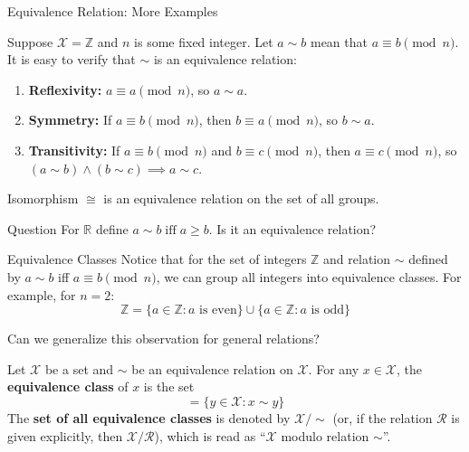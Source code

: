 \documentclass{zkdl-presentation-template}
\begin{document}
    \begin{frame}{Equivalence Relation: More Examples}
        \begin{example}
            Suppose $\mathcal{X} = \mathbb{Z}$ and $n$ is some fixed integer. Let $a \sim b$ mean that $a \equiv b \pmod{n}$. It is easy to verify that $\sim$ is an equivalence relation:
            \begin{enumerate}
                \item \textbf{Reflexivity:} $a \equiv a \pmod{n}$, so $a \sim a$.\pause
                \item \textbf{Symmetry:} If $a \equiv b \pmod{n}$, then $b \equiv a \pmod{n}$, so $b \sim a$.\pause
                \item \textbf{Transitivity:} If $a \equiv b \pmod{n}$ and $b \equiv c \pmod{n}$, then $a \equiv c \pmod{n}$, so $(a \sim b) \wedge (b \sim c) \implies a \sim c$.
            \end{enumerate}
        \end{example}

        \pause\begin{example}
            Isomorphism $\cong$ is an equivalence relation on the set of all groups.
        \end{example}

        \pause\begin{questionblock}{Question}
            For $\mathbb{R}$ define $a \sim b \; \text{iff} \; a \geq b$. Is it an equivalence relation?
        \end{questionblock}
    \end{frame}

    \begin{frame}{Equivalence Classes}
        Notice that for the set of integers $\mathbb{Z}$ and relation $\sim$ defined by $a \sim b$ iff $a \equiv b \pmod{n}$, we can group all integers into equivalence classes. For example, for $n=2$:
        \begin{equation*}
            \mathbb{Z} = \{a \in \mathbb{Z}: \text{$a$ is even}\} \cup \{a \in \mathbb{Z}: \text{$a$ is odd}\}
        \end{equation*}

        Can we generalize this observation for general relations?\pause

        \begin{definition}
            Let $\mathcal{X}$ be a set and $\sim$ be an equivalence relation on $\mathcal{X}$. For any $x \in \mathcal{X}$, the \textbf{equivalence class} of $x$ is the set
            \begin{equation*}
                [x] = \{y \in \mathcal{X}: x \sim y\}
            \end{equation*}
            \pause The \textbf{set of all equivalence classes} is denoted by $\mathcal{X}/\text{$\sim$}$ (or, if the relation $\mathcal{R}$ is given explicitly, then $\mathcal{X}/\mathcal{R}$), which is read as ``$\mathcal{X}$ modulo relation $\sim$''.
        \end{definition}
    \end{frame}
\end{document}
